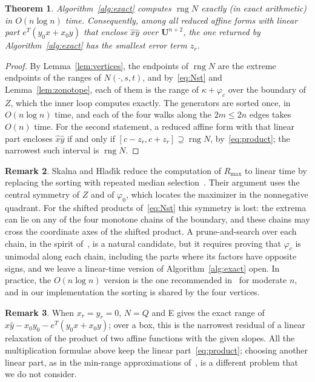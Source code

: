 \documentclass[10pt]{article}
\newtheorem{theorem}{Theorem}
\theoremstyle{definition}
\newtheorem{remark}[theorem]{Remark}
\newcommand{\U}{\mathbf{U}}
\newcommand{\rng}{\operatorname{rng}}
\begin{document}
\begin{theorem}
\label{thm:exact}
Algorithm~\ref{alg:exact} computes $\rng N$ exactly (in exact arithmetic) in $O(n\log n)$ time. Consequently, among all reduced affine forms with linear part $e^T(y_0x+x_0y)$ that enclose $\hat x\hat y$ over $\U^{n+2}$, the one returned by Algorithm~\ref{alg:exact} has the smallest error term $z_r$.
\end{theorem}
\begin{proof}
By Lemma~\ref{lem:vertices}, the endpoints of $\rng N$ are the extreme endpoints of the ranges of $N(\cdot,s,t)$, and by~\eqref{eq:Nst} and Lemma~\ref{lem:zonotope}, each of them is the range of $\kappa+\varphi_c$ over the boundary of $Z$, which the inner loop computes exactly. The generators are sorted once, in $O(n\log n)$ time, and each of the four walks along the $2m\le 2n$ edges takes $O(n)$ time. For the second statement, a reduced affine form with that linear part encloses $\hat x\hat y$ if and only if $[c-z_r,c+z_r]\supseteq\rng N$, by~\eqref{eq:product}; the narrowest such interval is $\rng N$.
\end{proof}

\begin{remark}
Skalna and Hlad\'{\i}k reduce the computation of $R_{\max}$ to linear time by replacing the sorting with repeated median selection~\cite[Prop.~8]{skalna2017new}. Their argument uses the central symmetry of $Z$ and of $\varphi_0$, which locates the maximizer in the nonnegative quadrant. For the shifted products of~\eqref{eq:Nst} this symmetry is lost: the extrema can lie on any of the four monotone chains of the boundary, and these chains may cross the coordinate axes of the shifted product. A prune-and-search over each chain, in the spirit of~\cite[Prop.~8]{skalna2017new}, is a natural candidate, but it requires proving that $\varphi_c$ is unimodal along each chain, including the parts where its factors have opposite signs, and we leave a linear-time version of Algorithm~\ref{alg:exact} open. In practice, the $O(n\log n)$ version is the one recommended in~\cite{skalna2017new} for moderate $n$, and in our implementation the sorting is shared by the four vertices.
\end{remark}

\begin{remark}
When $x_r=y_r=0$, $N=Q$ and E gives the exact range of $\hat x\hat y - x_0y_0 - e^T(y_0x+x_0y)$; over a box, this is the narrowest residual of a linear relaxation of the product of two affine functions with the given slopes. All the multiplication formulae above keep the linear part~\eqref{eq:product}; choosing another linear part, as in the min-range approximations of~\cite{stolfi1997self,skalna2013minrange}, is a different problem that we do not consider.
\end{remark}
\end{document}
